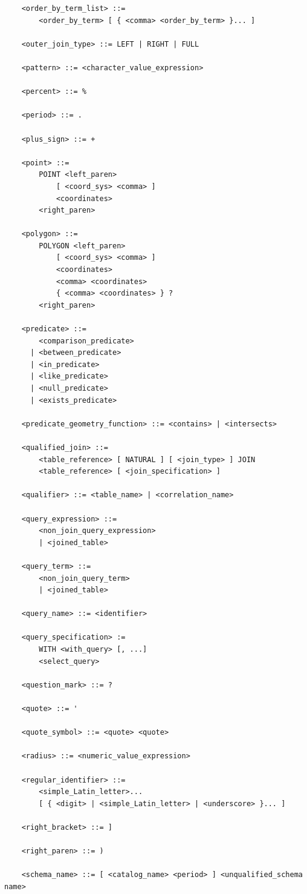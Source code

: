 \documentclass[11pt,a4paper]{ivoa}
\begin{document}
\begin{verbatim}
    <order_by_term_list> ::=
        <order_by_term> [ { <comma> <order_by_term> }... ]

    <outer_join_type> ::= LEFT | RIGHT | FULL

    <pattern> ::= <character_value_expression>

    <percent> ::= %

    <period> ::= .

    <plus_sign> ::= +

    <point> ::=
        POINT <left_paren>
            [ <coord_sys> <comma> ]
            <coordinates>
        <right_paren>

    <polygon> ::=
        POLYGON <left_paren>
            [ <coord_sys> <comma> ]
            <coordinates>
            <comma> <coordinates>
            { <comma> <coordinates> } ?
        <right_paren>

    <predicate> ::=
        <comparison_predicate>
      | <between_predicate>
      | <in_predicate>
      | <like_predicate>
      | <null_predicate>
      | <exists_predicate>

    <predicate_geometry_function> ::= <contains> | <intersects>

    <qualified_join> ::=
        <table_reference> [ NATURAL ] [ <join_type> ] JOIN
        <table_reference> [ <join_specification> ]

    <qualifier> ::= <table_name> | <correlation_name>

    <query_expression> ::=
        <non_join_query_expression>
        | <joined_table>

    <query_term> ::=
        <non_join_query_term>
        | <joined_table>

    <query_name> ::= <identifier>

    <query_specification> :=
        WITH <with_query> [, ...]
        <select_query>

    <question_mark> ::= ?

    <quote> ::= '

    <quote_symbol> ::= <quote> <quote>

    <radius> ::= <numeric_value_expression>

    <regular_identifier> ::=
        <simple_Latin_letter>...
        [ { <digit> | <simple_Latin_letter> | <underscore> }... ]

    <right_bracket> ::= ]

    <right_paren> ::= )

    <schema_name> ::= [ <catalog_name> <period> ] <unqualified_schema name>


\end{verbatim}
\end{document}
